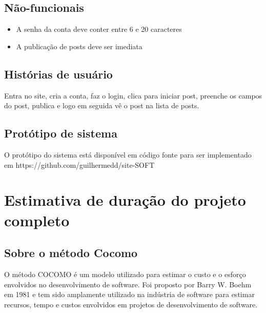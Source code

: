 \documentclass[12pt]{article}
\begin{document}
\subsection{Não-funcionais}
\begin{itemize}
  \item A senha da conta deve conter entre 6 e 20 caracteres
  \item A publicação de posts deve ser imediata
\end{itemize}
\subsection{Histórias de usuário} %
  Entra no site, cria a conta, faz o login, clica para iniciar post, 
  preenche os campos do post, publica e logo em seguida vê o post na lista de posts.
\subsection{Protótipo de sistema}
  O protótipo do sistema está disponível em código fonte para ser 
  implementado em https://github.com/guilhermedd/site-SOFT 

\section{Estimativa de duração do projeto completo}
\subsection{Sobre o método Cocomo}
  O método COCOMO é um modelo utilizado para estimar o custo e o esforço envolvidos 
  no desenvolvimento de software. Foi proposto por Barry W. Boehm em 1981 e 
  tem sido amplamente utilizado na indústria de software para estimar recursos, 
  tempo e custos envolvidos em projetos de desenvolvimento de software.



\end{document}
